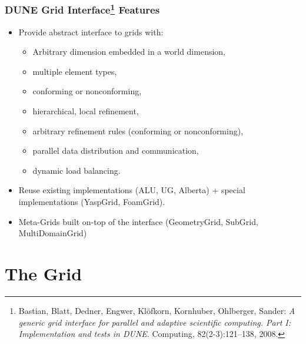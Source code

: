 \documentclass[ignorenonframetext,11pt]{beamer}
\theoremstyle{definition}
\begin{document}
\begin{frame}
\frametitle{DUNE Grid Interface\footnote{\tiny Bastian,
Blatt, Dedner, Engwer, Kl{\"{o}}fkorn, Kornhuber,
Ohlberger, Sander: {\em A generic grid interface for parallel and adaptive
  scientific computing. Part {I}: Implementation and tests in {DUNE}}.
  Computing, 82(2-3):121--138, 2008.} Features}
\begin{itemize}
\item Provide abstract interface to grids with:
\begin{itemize}
\item Arbitrary dimension embedded in a world dimension,
\item multiple element types,
\item conforming or nonconforming,
\item hierarchical, local refinement,
\item arbitrary refinement rules (conforming or nonconforming),
\item parallel data distribution and communication,
\item dynamic load balancing.
\end{itemize}
\item Reuse existing implementations (ALU, UG, Alberta) + special
implementations (YaspGrid, FoamGrid).
\item Meta-Grids built on-top of the interface (GeometryGrid, SubGrid,
  MultiDomainGrid)
\end{itemize}
\end{frame}

\section{The Grid}
\end{document}
